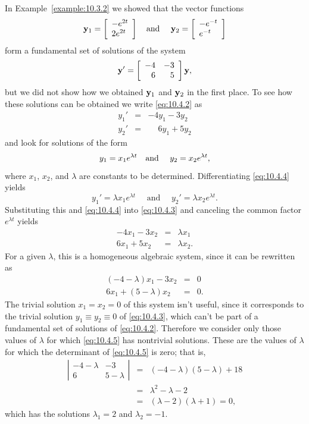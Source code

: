 In Example~\ref{example:10.3.2} we showed that the vector functions
\[
  {\bf y}_{1}=\left[\begin{array}{l}-e^{2t}\\2e^{2t}\end{array}\right]\mbox{\quad and \quad}{\bf y}_{2}=\left[\begin{array}{l}-e^{-t}\\e^{-t}\end{array}\right]
\]
form a fundamental set of solutions of the system
\begin{equation}
  \label{eq:10.4.2}{\bf y}'=\left[\begin{array}{rr} -4&-3\\6&5\end{array}\right]{\bf y},
\end{equation}
but we did not show how we obtained ${\bf y}_{1}$ and ${\bf y}_{2}$ in the first place. To see how
these solutions can be obtained we write \eqref{eq:10.4.2} as
\begin{equation}
  \label{eq:10.4.3}
  \begin{array}{ccc}
    y_{1}' & = & -4y_{1}-3y_{2}           \\
    y_{2}' & = & \phantom{-}6y_{1}+5y_{2}
  \end{array}
\end{equation}
and look for solutions of the form
\begin{equation}
  \label{eq:10.4.4}y_{1}=x_{1}e^{\lambda t}\mbox{\quad and \quad}y_{2}=x_{2}e^{\lambda t},
\end{equation}
where $x_{1}$, $x_{2}$, and $\lambda$ are constants to be determined. Differentiating
\eqref{eq:10.4.4} yields
\[
  y_{1}'=\lambda x_{1}e^{\lambda t}\quad\mbox{ and }\quad y_{2}'=\lambda x_{2}e^{\lambda t}.
\]
Substituting this and \eqref{eq:10.4.4} into \eqref{eq:10.4.3} and canceling the common factor
$e^{\lambda t}$ yields
\[
  \begin{array}{ccc}
    -4x_{1}-3x_{2} & = & \lambda x_{1}  \\
    6x_{1}+5x_{2}  & = & \lambda x_{2}.
  \end{array}
\]
For a given $\lambda$, this is a homogeneous algebraic system, since it can be rewritten as
\begin{equation}
  \label{eq:10.4.5}
  \begin{array}{rcl}
    (-4-\lambda)x_{1}-3x_{2} & = & 0  \\
    6x_{1}+(5-\lambda)x_{2}  & = & 0.
  \end{array}
\end{equation}
The trivial solution $x_{1}=x_{2}=0$ of this system isn't useful, since it corresponds to the
trivial solution $y_{1}\equiv y_{2}\equiv0$ of \eqref{eq:10.4.3}, which can't be part of a
fundamental set of solutions of \eqref{eq:10.4.2}. Therefore we consider only those values of
$\lambda$ for which \eqref{eq:10.4.5} has nontrivial solutions. These are the values of $\lambda$
for which the determinant of \eqref{eq:10.4.5} is zero; that is,
\begin{eqnarray*}
  \left|
  \begin{array}{cc}
    -4-\lambda & -3        \\
    6          & 5-\lambda
  \end{array}\right|&=& (-4-\lambda)(5-\lambda)+18\\&=&\lambda^{2}-\lambda-2\\ &=&(\lambda-2)(\lambda+1)=0,
\end{eqnarray*}
which has the solutions $\lambda_{1}=2$ and $\lambda_{2}=-1$.

